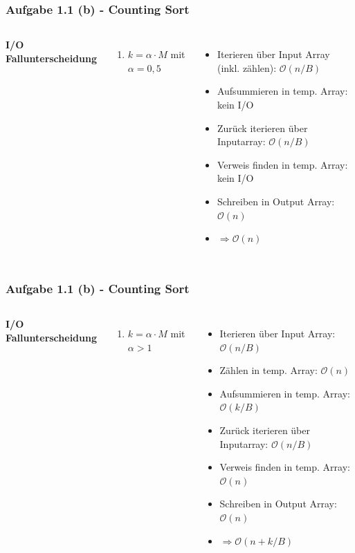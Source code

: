 \documentclass[aspectratio=169]{beamer}
\begin{document}
\begin{frame}
	\frametitle{Aufgabe 1.1 (b) - Counting Sort}
	\begin{columns}[c] %
	
	\textbf{I/O Fallunterscheidung}
	\begin{enumerate}
	\item $ k = \alpha \cdot M $ mit $\alpha = 0,5$
	\end{enumerate}
	

	\begin{itemize}
		\item Iterieren über Input Array (inkl. zählen): $\mathcal{O}(n/B)$\pause
		\item Aufsummieren in temp. Array: kein I/O\pause
		\item Zurück iterieren über Inputarray: $\mathcal{O}(n/B)$\pause
		\item Verweis finden in temp. Array: kein I/O\pause
		\item Schreiben in Output Array: $\mathcal{O}(n)$
		\item  $\Rightarrow \mathcal{O}(n)$
	\end{itemize}
	
	\end{columns}
	\end{frame}


\begin{frame}
	\frametitle{Aufgabe 1.1 (b) - Counting Sort}
	\begin{columns}[c] %
	
	\textbf{I/O Fallunterscheidung}
	\begin{enumerate}
	\item $ k = \alpha \cdot M $ mit $\alpha > 1$ 
	\end{enumerate}
	

	\begin{itemize}
		\item Iterieren über Input Array: $\mathcal{O}(n/B)$\pause
		\item Zählen in temp. Array: $\mathcal{O}(n)$\pause
		\item Aufsummieren in temp. Array: $\mathcal{O}(k/B)$\pause
		\item Zurück iterieren über Inputarray: $\mathcal{O}(n/B)$\pause
		\item Verweis finden in temp. Array: $\mathcal{O}(n)$\pause
		\item Schreiben in Output Array: $\mathcal{O}(n)$\pause
		\item $\Rightarrow \mathcal{O}(n + k/B)$
	\end{itemize}
	
	\end{columns}
	\end{frame}
\end{document}
